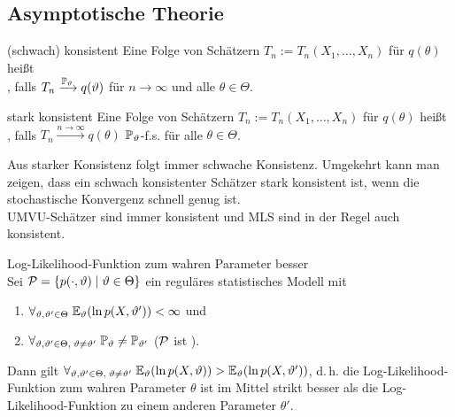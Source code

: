 \pagebreak

\subsection{%
    Asymptotische Theorie%
}

\begin{Def}{(schwach) konsistent}
    Eine Folge von Schätzern $T_n := T_n(X_1, \dotsc, X_n)$ für $q(\theta)$ heißt\\
    , falls
    $T_n \xrightarrow{\PP_\theta} q(\theta)$ für $n \to \infty$ und alle $\theta \in \Theta$.
\end{Def}

\begin{Def}{stark konsistent}
    Eine Folge von Schätzern $T_n := T_n(X_1, \dotsc, X_n)$ für $q(\theta)$ heißt\\
    , falls
    $T_n \xrightarrow{n \to \infty} q(\theta)$ $\PP_\theta$-f.s. für alle $\theta \in \Theta$.
\end{Def}

\begin{Bem}
    Aus starker Konsistenz folgt immer schwache Konsistenz.
    Umgekehrt kann man zeigen, dass ein schwach konsistenter Schätzer stark konsistent ist,
    wenn die stochastische Konvergenz schnell genug ist.\\
    UMVU-Schätzer sind immer konsistent und MLS sind in der Regel auch konsistent.
\end{Bem}

\linie

\begin{Satz}{Log-Likelihood-Funktion zum wahren Parameter besser}\\
    Sei $\P = \{p(\cdot, \theta) \;|\; \theta \in \Theta\}$
    ein reguläres statistisches Modell mit
    \begin{enumerate}
        \item
        $\forall_{\theta, \theta' \in \Theta}\; \EE_\theta(\ln p(X, \theta')) < \infty$ und
        
        \item
        $\forall_{\theta, \theta' \in \Theta,\; \theta \not= \theta'}\;
        \PP_\theta \not= \PP_{\theta'}$
        ($\P$ ist ).
    \end{enumerate}
    Dann gilt $\forall_{\theta, \theta' \in \Theta,\; \theta \not= \theta'}\;
    \EE_\theta(\ln p(X, \theta)) > \EE_\theta(\ln p(X, \theta'))$,
    d.\,h. die Log-Likelihood-Funktion zum wahren Parameter $\theta$ ist im Mittel strikt besser
    als die Log-Likelihood-Funktion zu einem anderen Parameter $\theta'$.
\end{Satz}

